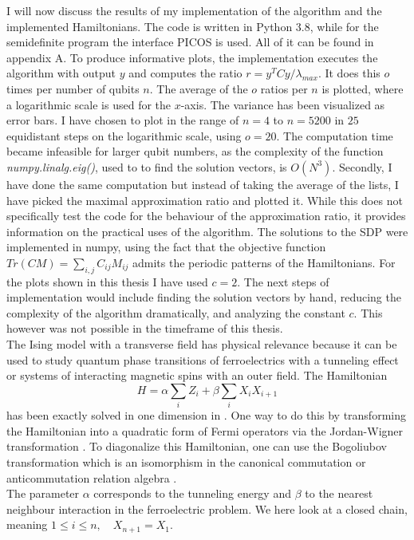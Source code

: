 I will now discuss the results of my implementation of the algorithm and the implemented Hamiltonians.
The code is written in Python 3.8, while for the semidefinite program the interface PICOS is used.
All of it can be found in appendix A.
To produce informative plots, the implementation executes the algorithm with output $y$ and computes the ratio $r=y^{T}Cy/\lambda_{max}$.
It does this $o$ times per number of qubits $n$.
The average of the $o$ ratios per $n$ is plotted, where a logarithmic scale is used for the $x$-axis.
The variance has been visualized as error bars.
I have chosen to plot in the range of $n=4$ to $n=5200$ in $25$ equidistant steps on the logarithmic scale, using $o=20$.
The computation time became infeasible for larger qubit numbers, as the complexity of the function \emph{numpy.linalg.eig()}, used to to find the solution vectors, is $O\left(N^3\right) $.
Secondly, I have done the same computation but instead of taking the average of the lists, I have picked the maximal approximation ratio and plotted it.
While this does not specifically test the code for the behaviour of the approximation ratio, it provides information on the practical uses of the algorithm.
The solutions to the SDP were implemented in numpy, using the fact that the objective function $Tr(CM)=\sum_{i,j}C_{ij}M_{ij}$ admits the periodic patterns of the Hamiltonians.
For the plots shown in this thesis I have used $c=2$.
The next steps of implementation would include finding the solution vectors by hand, reducing the complexity of the algorithm dramatically, and analyzing the constant $c$.
This however was not possible in the timeframe of this thesis.\\
The Ising model with a transverse field has physical relevance because it can be used to study quantum phase transitions of ferroelectrics with a tunneling effect or systems of interacting magnetic spins with an outer field.
The Hamiltonian
\[
H=\alpha \sum_{i} Z_i + \beta \sum_{i} X_iX_{i+1}
\]
has been exactly solved in one dimension in \cite{pfeuty70}.
One way to do this by transforming the Hamiltonian into a quadratic form of Fermi operators via the Jordan-Wigner transformation \cite{nielsen05}.
To diagonalize this Hamiltonian, one can use the Bogoliubov transformation which is an isomorphism in the canonical commutation or anticommutation relation algebra \cite{bogoljubov58}.\\
The parameter $\alpha$ corresponds to the tunneling energy and $\beta$ to the nearest neighbour interaction in the ferroelectric problem.
We here look at a closed chain, meaning $1\le i \le n, \quad X_{n+1}=X_{1}$.
